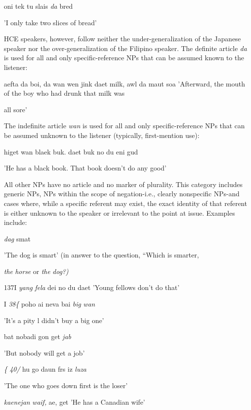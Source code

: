 \ea\label{ex:33}
 oni tek tu slais \textit{da} bred
\glt
\z

'I only take two slices of bread'

HCE speakers, however, follow neither the under-generalization of the Japanese speaker nor the over-generalization of the Filipino speaker. The definite article \textit{da} is used for all and only specific-refer\-ence NPs that can be assumed known to the listener:

\ea\label{ex:34}
 aefta da boi, da wan wen jink daet milk, awl da maut soa 'Afterward, the mouth of the boy who had drunk that milk was
\glt
\z

all sore'

The indefinite article \textit{wan} is used for all and only specific-reference NPs that can be assumed unknown to the listener (typically, first-mention use):

\ea\label{ex:35}
 higet wan blaek buk. daet buk no du eni gud
\glt
\z

'He has a black book. That book doesn't do any good'

All other NPs have no article and no marker of plurality. This category includes generic NPs, NPs within the scope of negation-i.e., clearly nonspecific NPs-and cases where, while a specific referent may exist, the exact identity of that referent is either unknown to the speaker or irrelevant to the point at issue. Examples include:

\ea\label{ex:36}
 \textit{dag} smat
\glt
\z

'The dog is smart' (in answer to the question, ``Which is smarter,

\textit{the} \textit{horse} or \textit{the} \textit{dog?{\textquotedbl})}

137I \textit{ya}\textit{n}\textit{g} \textit{fela} dei no du daet 'Young fellows don't do that'


I \textit{38\{ }poho ai neva bai \textit{big} \textit{wan}

'It's a pity l didn't buy a big one'

\ea\label{ex:39}
 bat nobadi gon get \textit{jab}
\glt
\z

'But nobody will get a job'

\textit{\{} \textit{40/ }hu go daun frs iz \textit{luza}

'The one who goes down first is the loser'

\ea\label{ex:41}
 \textit{kaenejan} \textit{waif,} ae, get 'He has a Canadian wife'
\glt
\z

